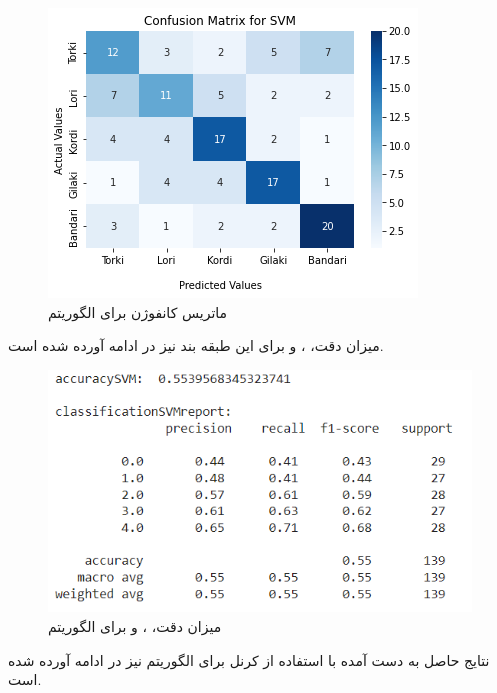 \begin{figure}[h!]
	\centering
	\includegraphics[width=1\linewidth]{images/svm_confusion_matrix.png}
	\caption{ماتریس کانفوژن برای الگوریتم }
	\label{fig:svm_confusion_matrix}
\end{figure}

میزان دقت، ،  و  برای این طبقه بند نیز در ادامه آورده شده است.

\begin{figure}[h!]
	\centering
	\includegraphics[width=1\linewidth]{images/svm_scores.PNG}
	\caption{میزان دقت، ،  و  برای الگوریتم }
	\label{fig:svm_scores}
\end{figure}

نتایج حاصل به دست آمده با استفاده از کرنل  برای الگوریتم  نیز در ادامه آورده شده است.

